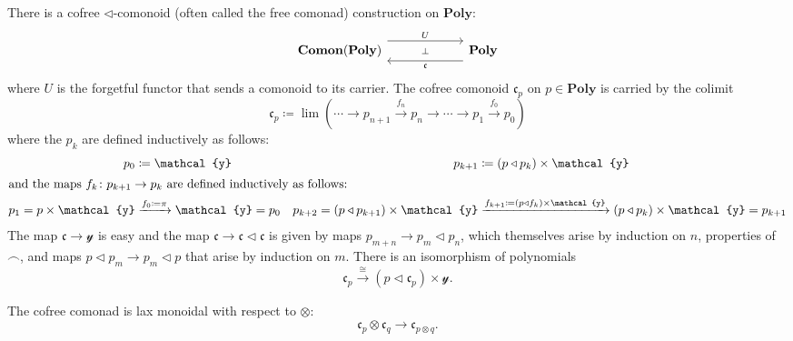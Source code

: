 \documentclass[11pt, one side, article]{memoir}
\theoremstyle{definition}
\theoremstyle{plain}
\newcommand{\Cat}[1]{\mathbf{#1}}%
\newcommand{\To}[2][]{\xrightarrow[#1]{#2}}
\newcommand{\yon}{\mathcal{y}}
\newcommand{\poly}{\Cat{Poly}}
\newcommand{\0}{\textsf{0}}
\newcommand{\1}{\tn{\textsf{1}}}
\newcommand{\tri}{\mathbin{\triangleleft}}
\begin{document}
There is a cofree $\tri$-comonoid (often called the free comonad) construction on $\poly$:
\begin{equation}
\begin{tikzcd}[column sep=60pt]
	\Cat{Comon}(\poly)
  	\ar[from=r, shift left=8pt, "\mathfrak{c}"]
		\ar[from=r, phantom, "\scriptstyle\bot"]
  	&
	\poly
		\ar[from=l, shift right=-8pt, "U"]
\end{tikzcd}
\end{equation}
where $U$ is the forgetful functor that sends a comonoid to its carrier. The cofree comonoid $\mathfrak{c}_p$ on $p\in\poly$ is carried by the colimit
\begin{equation}
\mathfrak{c}_p\coloneqq\lim(\cdots\to p_{n+1}\To{f_n} p_n\to\cdots\to p_1\To{f_0} p_0)
\end{equation}
where the $p_k$ are defined inductively as follows:
\begin{align}
	p_0&\coloneqq\yon&p_{k+1}&\coloneqq (p\tri p_k)\times\yon\\
\intertext{and the maps $f_k\colon p_{k+1}\to p_k$ are defined inductively as follows:}
	p_1=p\times\yon&\To{f_0\coloneqq\pi}\yon=p_0&p_{k+2}=(p\tri p_{k+1})\times\yon&\To{f_{k+1}\coloneqq(p\tri f_k)\times\yon}(p\tri p_{k})\times\yon=p_{k+1}
\end{align}
The map $\mathfrak{c}\to\yon$ is easy and the map $\mathfrak{c}\to\mathfrak{c}\tri\mathfrak{c}$ is given by maps $p_{m+n}\to p_m\tri p_n$, which themselves arise by induction on $n$, properties of $\frown$, and maps $p\tri p_m\to p_m\tri p$ that  arise by induction on $m$. There is an isomorphism of polynomials
\begin{equation}
	\mathfrak{c}_p\To{\cong} (p\tri\mathfrak{c}_p)\times\yon.
\end{equation}

The cofree comonad is lax monoidal with respect to $\otimes$:
\begin{equation}
  \mathfrak{c}_p\otimes\mathfrak{c}_q\to\mathfrak{c}_{p\otimes q}.
\end{equation}
\end{document}
